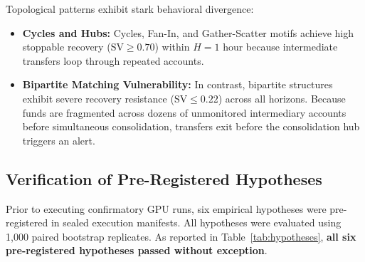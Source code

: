 \documentclass[pdflatex,sn-mathphys,Numbered]{sn-jnl}
\renewenvironment{table*}[1][!htbp]{\begin{tableorg}[#1]\begin{center}\tablebodyfont}{\end{center}\end{tableorg}}
\theoremstyle{thmstyleone}
\theoremstyle{thmstyletwo}
\theoremstyle{thmstylethree}
\begin{document}
\begin{table}[!htbp]
\centering
\small
\caption{\textbf{Typology Decomposition of Detection Rate and Stoppable Value (\texttt{HI-Small}).}}
\label{tab:typology_breakdown}
\end{table}

Topological patterns exhibit stark behavioral divergence:
\begin{itemize}
    \item \textbf{Cycles and Hubs:} Cycles, Fan-In, and Gather-Scatter motifs achieve high stoppable recovery ($\text{SV} \ge 0.70$) within $H=1\text{ hour}$ because intermediate transfers loop through repeated accounts.
    \item \textbf{Bipartite Matching Vulnerability:} In contrast, bipartite structures exhibit severe recovery resistance ($\text{SV} \le 0.22$) across all horizons. Because funds are fragmented across dozens of unmonitored intermediary accounts before simultaneous consolidation, transfers exit before the consolidation hub triggers an alert.
\end{itemize}

\subsection{Verification of Pre-Registered Hypotheses}
Prior to executing confirmatory GPU runs, six empirical hypotheses were pre-registered in sealed execution manifests. All hypotheses were evaluated using 1,000 paired bootstrap replicates. As reported in Table~\ref{tab:hypotheses}, \textbf{all six pre-registered hypotheses passed without exception}.
\end{document}
